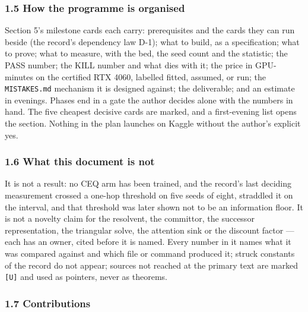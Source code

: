 \documentclass[11pt,a4paper]{article}
\theoremstyle{plain}
\theoremstyle{definition}
\theoremstyle{remark}
\begin{document}
\subsubsection{1.5 How the programme is
organised}\label{how-the-programme-is-organised}

Section 5's milestone cards each carry: prerequisites and the cards they
can run beside (the record's dependency law D-1); what to build, as a
specification; what to prove; what to measure, with the bed, the seed
count and the statistic; the PASS number; the KILL number and what dies
with it; the price in GPU-minutes on the certified RTX 4060, labelled
fitted, assumed, or run; the \texttt{MISTAKES.md} mechanism it is
designed against; the deliverable; and an estimate in evenings. Phases
end in a gate the author decides alone with the numbers in hand. The
five cheapest decisive cards are marked, and a first-evening list opens
the section. Nothing in the plan launches on Kaggle without the author's
explicit yes.

\subsubsection{1.6 What this document is
not}\label{what-this-document-is-not}

It is not a result: no CEQ arm has been trained, and the record's last
deciding measurement crossed a one-hop threshold on five seeds of eight,
straddled it on the interval, and that threshold was later shown not to
be an information floor. It is not a novelty claim for the resolvent,
the committor, the successor representation, the triangular solve, the
attention sink or the discount factor --- each has an owner, cited
before it is named. Every number in it names what it was compared
against and which file or command produced it; struck constants of the
record do not appear; sources not reached at the primary text are marked
\texttt{{[}U{]}} and used as pointers, never as theorems.

\subsubsection{1.7 Contributions}\label{contributions}
\end{document}
